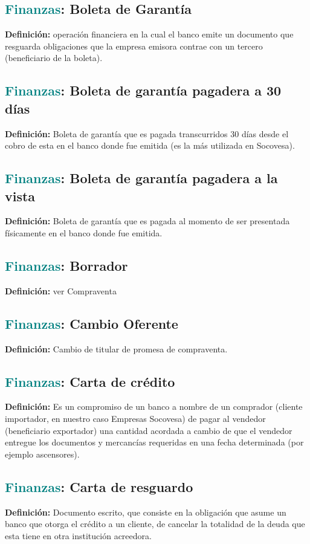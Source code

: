 \documentclass[12pt]{article}
\begin{document}
\subsection{\textcolor{teal}{Finanzas}: Boleta de Garantía}
\textbf{Definición:} operación financiera en la cual el banco emite un documento que resguarda obligaciones que la empresa emisora contrae con un tercero (beneficiario de la boleta).
\subsection{\textcolor{teal}{Finanzas}: Boleta de garantía pagadera a 30 días}
\textbf{Definición:} Boleta de garantía que es pagada transcurridos 30 días desde el cobro de esta en el banco donde fue emitida (es la más utilizada en Socovesa).
\subsection{\textcolor{teal}{Finanzas}: Boleta de garantía pagadera a la vista}
\textbf{Definición:} Boleta de garantía que es pagada al momento de ser presentada físicamente en el banco donde fue emitida.
\subsection{\textcolor{teal}{Finanzas}: Borrador}
\textbf{Definición:} ver Compraventa
\subsection{\textcolor{teal}{Finanzas}: Cambio Oferente}
\textbf{Definición:} Cambio de titular de promesa de compraventa.
\subsection{\textcolor{teal}{Finanzas}: Carta de crédito}
\textbf{Definición:} Es un compromiso de un banco a nombre de un comprador (cliente importador, en nuestro caso Empresas Socovesa) de pagar al vendedor (beneficiario exportador) una cantidad acordada a cambio de que el vendedor entregue los documentos y mercancías requeridas en una fecha determinada (por ejemplo ascensores).
\subsection{\textcolor{teal}{Finanzas}: Carta de resguardo}
\textbf{Definición:} Documento escrito, que consiste en la obligación que asume un banco que otorga el crédito a un cliente, de cancelar la totalidad de la deuda que esta tiene en otra institución acreedora.
\end{document}

